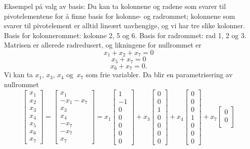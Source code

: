 \begin{losning}
\begin{punkt}
\noindent
Eksempel på valg av basis: Du kan ta kolonnene og radene som svarer til pivotelementene for å finne basis for kolonne- og radrommet; kolonnene som svarer til pivotelement er alltid lineært uavhengige, og vi har tre slike kolonner. Basis for kolonnerommet: kolonne 2, 5 og 6. Basis for radrommet: rad 1, 2 og 3. Matrisen er allerede radredusert, og likningene for nullrommet er $$x_1+x_2+x_7=0$$ $$x_5+x_7=0$$ $$x_6+x_7=0.$$ Vi kan ta $x_1$, $x_3$, $x_4$ og~$x_7$ som frie variabler. Da blir en parametrisering av nullrommet
$$\begin{bmatrix}
x_1\\
x_2\\
x_3\\
x_4\\
x_5\\
x_6\\
x_7
\end{bmatrix}=\begin{bmatrix}
x_1\\
-x_1-x_7\\
x_3\\
x_4\\
-x_7\\
-x_7\\
x_7
\end{bmatrix}=x_1\begin{bmatrix}
1\\
-1\\
0\\
0\\
0\\
0\\
0
\end{bmatrix}+x_3\begin{bmatrix}
0\\
0\\
1\\
0\\
0\\
0\\
0
\end{bmatrix}+x_4\begin{bmatrix}
0\\
0\\
0\\
1\\
0\\
0\\
0
\end{bmatrix}+x_7\begin{bmatrix}
0\\
0\\

\end{bmatrix}$$
\end{punkt}
\end{losning}
